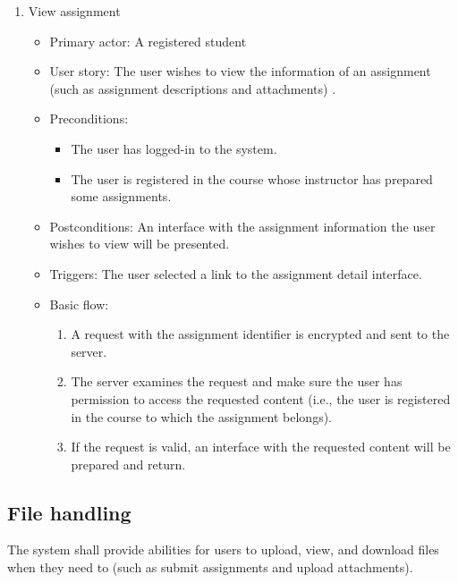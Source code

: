 \begin{enumerate}
\item View assignment
\begin{itemize}
    \item Primary actor: A registered student
    \item User story: The user wishes to view the information of an assignment
     (such as assignment descriptions and attachments) .
    \item Preconditions:
        \begin{itemize}
            \item The user has logged-in to the system.
            \item The user is registered in the course whose instructor has
                prepared some assignments.
        \end{itemize}
    \item Postconditions: An interface with the assignment information the user
        wishes to view will be presented.
    \item Triggers: The user selected a link to the assignment detail interface.
    \item Basic flow:
        \begin{enumerate}
            \item A request with the assignment identifier is encrypted and
                sent to the server.
            \item The server examines the request and make sure the user has
                permission to access the requested content (i.e., the user is
                registered in the course to which the assignment belongs).
            \item If the request is valid, an interface with the requested
                content will be prepared and return.
        \end{enumerate}
\end{itemize}
\end{enumerate}

\subsection{File handling}
The system shall provide abilities for users to upload, view, and download
files when they need to (such as submit assignments and upload attachments).

